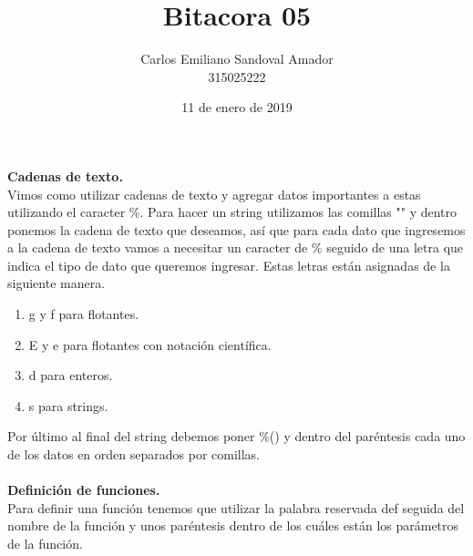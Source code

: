 \documentclass[letterpaper, 12pt, oneside]{article}%
\title{Bitacora 05}
\author{Carlos Emiliano Sandoval Amador \\ 315025222}
\date{11 de enero de 2019}
\begin{document}
	\maketitle
	\textbf{Cadenas de texto.} \\ Vimos como utilizar cadenas de texto y agregar datos importantes a estas utilizando el caracter  \%. Para hacer un string utilizamos las comillas "" y dentro ponemos la cadena de texto que deseamos, así que para cada dato que ingresemos a la cadena de texto vamos a necesitar un caracter de \% seguido de una letra que indica el tipo de dato que queremos ingresar. Estas letras están asignadas de la siguiente manera.
	\begin{enumerate}
		\item g y f para flotantes.
		\item E y e para flotantes con notación científica.
		\item d para enteros.
		\item s para strings.
	\end{enumerate}
	Por último al final del string debemos poner \%() y dentro del paréntesis cada uno de los datos en orden separados por comillas. \\ \\ \textbf{Definición de funciones.} \\ Para definir una función tenemos que utilizar la palabra reservada def seguida del nombre de la función y unos paréntesis dentro de los cuáles están los parámetros de la función.
	
 	
\end{document}
